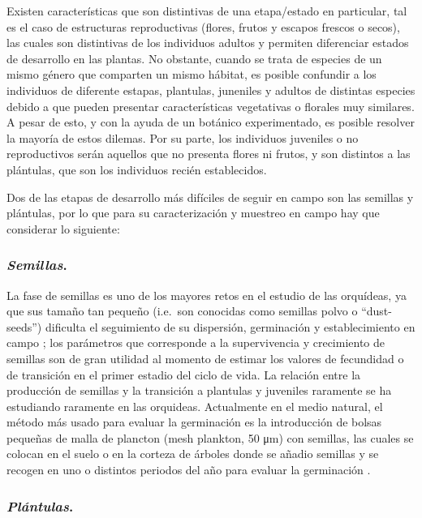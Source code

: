 \documentclass[
]{book}
\theoremstyle{definition}
\theoremstyle{definition}
\theoremstyle{definition}
\theoremstyle{definition}
\theoremstyle{remark}
\begin{document}
Existen características que son distintivas de una etapa/estado en particular, tal es el caso de estructuras reproductivas (flores, frutos y escapos frescos o secos), las cuales son distintivas de los individuos adultos y permiten diferenciar estados de desarrollo en las plantas.
No obstante, cuando se trata de especies de un mismo género que comparten un mismo hábitat, es posible confundir a los individuos de diferente estapas, plantulas, juneniles y adultos de distintas especies debido a que pueden presentar características vegetativas o florales muy similares.
A pesar de esto, y con la ayuda de un botánico experimentado, es posible resolver la mayoría de estos dilemas.
Por su parte, los individuos juveniles o no reproductivos serán aquellos que no presenta flores ni frutos, y son distintos a las plántulas, que son los individuos recién establecidos.

Dos de las etapas de desarrollo más difíciles de seguir en campo son las semillas y plántulas, por lo que para su caracterización y muestreo en campo hay que considerar lo siguiente:

\subsubsection{\texorpdfstring{\emph{Semillas}.}{Semillas.}}\label{semillas.}

La fase de semillas es uno de los mayores retos en el estudio de las orquídeas, ya que sus tamaño tan pequeño (i.e.~son conocidas como semillas polvo o ``dust-seeds'') dificulta el seguimiento de su dispersión, germinación y establecimiento en campo \citep{ackerman1996seedling, ticktin2020synthesis} ; los parámetros que corresponde a la supervivencia y crecimiento de semillas son de gran utilidad al momento de estimar los valores de fecundidad o de transición en el primer estadio del ciclo de vida.
La relación entre la producción de semillas y la transición a plantulas y juveniles raramente se ha estudiando raramente en las orquideas.
Actualmente en el medio natural, el método más usado para evaluar la germinación es la introducción de bolsas pequeñas de malla de plancton (mesh plankton, 50 μm) con semillas, las cuales se colocan en el suelo o en la corteza de árboles donde se añadio semillas y se recogen en uno o distintos periodos del año para evaluar la germinación \citep{rasmussen1993seed, rasmussen2011methods, anghelescu2023asymbiotic}.

\subsubsection{\texorpdfstring{\emph{Plántulas}.}{Plántulas.}}\label{pluxe1ntulas.}
\end{document}

